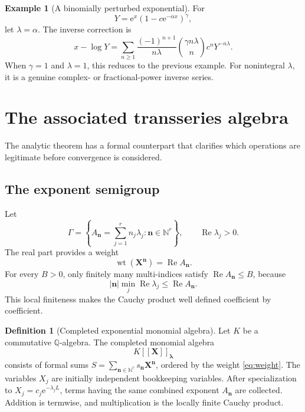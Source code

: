 \documentclass[11pt,oneside]{article}
\theoremstyle{plain}
\theoremstyle{definition}
\newtheorem{definition}[theorem]{Definition}
\newtheorem{example}[theorem]{Example}
\theoremstyle{remark}
\newcommand{\e}{\mathrm{e}}
\newcommand{\N}{\mathbb{N}}
\newcommand{\abs}[1]{\left\lvert#1\right\rvert}
\newcommand{\Real}{\operatorname{Re}}
\begin{document}
\begin{example}[A binomially perturbed exponential]
For
\[
 Y=\e^x(1-c\e^{-\alpha x})^\gamma,
\]
let \(\lambda=\alpha\).  The inverse correction is
\begin{equation}
 x-\log Y
 =\sum_{n\ge1}\frac{(-1)^{n+1}}{n\lambda}
 \binom{\gamma n\lambda}{n}
 c^nY^{-n\lambda}.
 \label{eq:one-factor-general}
\end{equation}
When \(\gamma=1\) and \(\lambda=1\), this reduces to the previous example.
For nonintegral \(\lambda\), it is a genuine complex- or fractional-power
inverse series.
\end{example}

\section{The associated transseries algebra}
\label{sec:transseries-algebra}

The analytic theorem has a formal counterpart that clarifies which operations
are legitimate before convergence is considered.

\subsection{The exponent semigroup}

Let
\begin{equation}
 \Gamma=\left\{A_{\bm n}=\sum_{j=1}^rn_j\lambda_j:
 \bm n\in\N^r\right\},
 \qquad \Real\lambda_j>0.
 \label{eq:Gamma-semigroup}
\end{equation}
The real part provides a weight
\begin{equation}
 \operatorname{wt}(\bm X^{\bm n})=\Real A_{\bm n}.
 \label{eq:weight}
\end{equation}
For every \(B>0\), only finitely many multi-indices satisfy
\(\Real A_{\bm n}\le B\), because
\[
 \abs{\bm n}\min_j\Real\lambda_j\le \Real A_{\bm n}.
\]
This local finiteness makes the Cauchy product well defined coefficient by
coefficient.

\begin{definition}[Completed exponential monomial algebra]
\label{def:completed-algebra}
Let \(K\) be a commutative \(\mathbb Q\)-algebra.  The
completed monomial algebra
\begin{equation}
 K[[\bm X]]_{\bm\lambda}
 \label{eq:completed-algebra}
\end{equation}
consists of formal sums
\(S=\sum_{\bm n\in\N^r}s_{\bm n}\bm X^{\bm n}\), ordered by the weight
\eqref{eq:weight}.  The variables \(X_j\) are initially independent
bookkeeping variables.  After specialization to
\(X_j=c_j\e^{-\lambda_jL}\), terms having the same combined exponent
\(A_{\bm n}\) are collected.  Addition is termwise, and multiplication is
the locally finite Cauchy product.
\end{definition}
\end{document}
